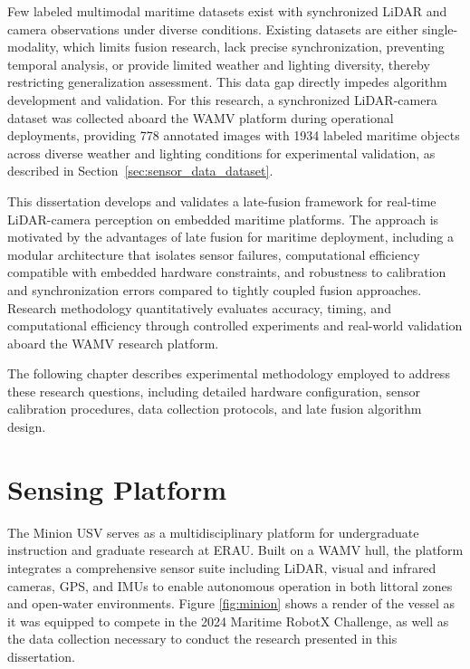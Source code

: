 \documentclass{erauthesis}
\begin{document}
Few labeled multimodal maritime datasets exist with synchronized \ac{LiDAR} and camera observations under diverse conditions.
Existing datasets are either single-modality, which limits fusion research, lack precise synchronization, preventing temporal analysis, or provide limited weather and lighting diversity, thereby restricting generalization assessment.
This data gap directly impedes algorithm development and validation.
For this research, a synchronized \ac{LiDAR}-camera dataset was collected aboard the \acl{WAMV} platform during operational deployments, providing 778 annotated images with 1934 labeled maritime objects across diverse weather and lighting conditions for experimental validation, as described in Section~\ref{sec:sensor_data_dataset}.

This dissertation develops and validates a late-fusion framework for real-time \ac{LiDAR}-camera perception on embedded maritime platforms.
The approach is motivated by the advantages of late fusion for maritime deployment, including a modular architecture that isolates sensor failures, computational efficiency compatible with embedded hardware constraints, and robustness to calibration and synchronization errors compared to tightly coupled fusion approaches.
Research methodology quantitatively evaluates accuracy, timing, and computational efficiency through controlled experiments and real-world validation aboard the \ac{WAMV} research platform.

The following chapter describes experimental methodology employed to address these research questions, including detailed hardware configuration, sensor calibration procedures, data collection protocols, and late fusion algorithm design.

\chapter{Sensing Platform} \label{sensing_platform}
% 

The Minion \ac{USV} serves as a multidisciplinary platform for undergraduate instruction and graduate research at \ac{ERAU}.
Built on a \ac{WAMV} hull, the platform integrates a comprehensive sensor suite including \ac{LiDAR}, visual and infrared cameras, \ac{GPS}, and \acp{IMU} to enable autonomous operation in both littoral zones and open-water environments.
Figure \ref{fig:minion} shows a render of the vessel as it was equipped to compete in the 2024 Maritime RobotX Challenge, as well as the data collection necessary to conduct the research presented in this dissertation.
\end{document}
